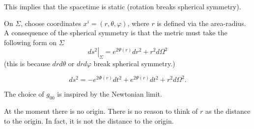 \begin{claim}
  This implies that the spacetime is static (rotation breaks spherical symmetry).
\end{claim}

On $\Sigma$, choose coordinates $x^{i} = (r, \theta, \varphi)$, where $r$ is defined via the area-radius.
A consequence of the spherical symmetry is that the metric must take the following form on $\Sigma$
\begin{equation}
  \left.ds^2 \right\rvert_{\Sigma} = e^{2\Psi(r)} dr^2 + r^2 d\Omega^2
\end{equation}
(this is because $dr d\theta$ or $dr d\varphi$ break spherical symmetry.)

\begin{equation}
  \label{eq:static-sph-sym}
  ds^2 = -e^{2 \Phi(r)} dt^2 + e^{2 \Psi(r)} dt^2 + r^2 d\Omega^2.
\end{equation}
\begin{leftbar}
  The choice of $g_{00}$ is inspired by the Newtonian limit.
\end{leftbar}
\begin{leftbar}
  At the moment there is no origin. There is no reason to think of $r$ as the distance to the origin. In fact, it is not the distance to the origin.
\end{leftbar}
